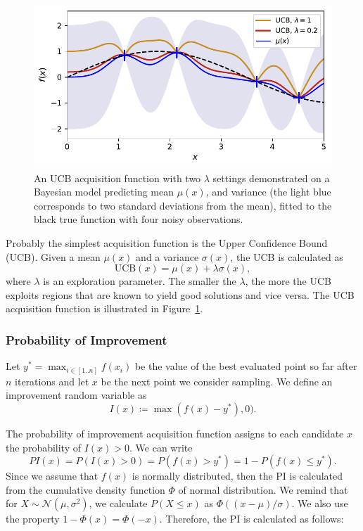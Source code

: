 \begin{figure}
    \centering
    \includegraphics[scale=0.8]{img/ucb_example.pdf}
    \caption{An UCB acquisition function with two $\lambda$ settings demonstrated on a Bayesian model predicting mean $\mu(x)$, and variance (the light blue corresponds to two standard deviations from the mean), fitted to the black true function with four noisy observations.}
    \label{fig:ucb}
\end{figure}

Probably the simplest acquisition function is the Upper Confidence Bound (UCB). Given a mean $\mu(x)$ and a variance $\sigma(x)$, the UCB is calculated as
\[
    \text{UCB}(x) = \mu(x) + \lambda \sigma(x),
\]
where $\lambda$ is an exploration parameter. The smaller the $\lambda$, the more the UCB exploits regions that are known to yield good solutions and vice versa. The UCB acquisition function is illustrated in Figure~\ref{fig:ucb}.

\subsubsection{Probability of Improvement}
Let $y^*=\max_{i\in[1..n]} f(x_i)$ be the value of the best evaluated point so far after $n$ iterations and let $x$ be the next point we consider sampling. We define an improvement random variable as
\[
    I(x) \coloneq \max(f(x) - y^*),0).
\]

The probability of improvement acquisition function assigns to each candidate $x$ the probability of $I(x) > 0$. We can write
\[
    PI(x) = P(I(x) > 0) = P(f(x) > y^*) = 1-P(f(x) \leq y^*).
\]
Since we assume that $f(x)$ is normally distributed, then the PI is calculated from the cumulative density function $\Phi$ of normal distribution. We remind that for $X \sim \mathcal{N}(\mu,\sigma^2)$, we calculate $P(X \leq x)$ as $\Phi ((x-\mu)/\sigma )$. We also use the property $1-\Phi(x)=\Phi(-x)$. Therefore, the PI is calculated as follows:

